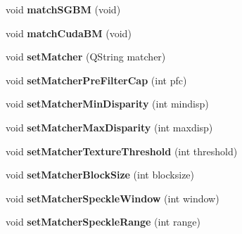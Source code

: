 \begin{DoxyCompactItemize}
\item 
\hypertarget{class_q_stereo_camera_ae4741706dc72c5be061c6ca218e1ad05}{}void {\bfseries match\+S\+G\+B\+M} (void)\label{class_q_stereo_camera_ae4741706dc72c5be061c6ca218e1ad05}

\item 
\hypertarget{class_q_stereo_camera_add46dbf7859730fa50a4cc83dc886974}{}void {\bfseries match\+Cuda\+B\+M} (void)\label{class_q_stereo_camera_add46dbf7859730fa50a4cc83dc886974}

\item 
\hypertarget{class_q_stereo_camera_a248782fdebc3cdf41420b3d84659977b}{}void {\bfseries set\+Matcher} (Q\+String matcher)\label{class_q_stereo_camera_a248782fdebc3cdf41420b3d84659977b}

\item 
\hypertarget{class_q_stereo_camera_aabf3ecce7eb18bb01bb112d777f10776}{}void {\bfseries set\+Matcher\+Pre\+Filter\+Cap} (int pfc)\label{class_q_stereo_camera_aabf3ecce7eb18bb01bb112d777f10776}

\item 
\hypertarget{class_q_stereo_camera_a803f534dac5c97cc917d2b4496dfdf17}{}void {\bfseries set\+Matcher\+Min\+Disparity} (int mindisp)\label{class_q_stereo_camera_a803f534dac5c97cc917d2b4496dfdf17}

\item 
\hypertarget{class_q_stereo_camera_aa64c0dde412216add90face6405f2271}{}void {\bfseries set\+Matcher\+Max\+Disparity} (int maxdisp)\label{class_q_stereo_camera_aa64c0dde412216add90face6405f2271}

\item 
\hypertarget{class_q_stereo_camera_aee2bf5eea7c676d667259d42a78df576}{}void {\bfseries set\+Matcher\+Texture\+Threshold} (int threshold)\label{class_q_stereo_camera_aee2bf5eea7c676d667259d42a78df576}

\item 
\hypertarget{class_q_stereo_camera_a722a9df6ecd425106dd8b8e893bbad06}{}void {\bfseries set\+Matcher\+Block\+Size} (int blocksize)\label{class_q_stereo_camera_a722a9df6ecd425106dd8b8e893bbad06}

\item 
\hypertarget{class_q_stereo_camera_a4cbadff365cabfff41667b1d915a6a54}{}void {\bfseries set\+Matcher\+Speckle\+Window} (int window)\label{class_q_stereo_camera_a4cbadff365cabfff41667b1d915a6a54}

\item 
\hypertarget{class_q_stereo_camera_a0343c15d9652e1729b377a76b195bee0}{}void {\bfseries set\+Matcher\+Speckle\+Range} (int range)\label{class_q_stereo_camera_a0343c15d9652e1729b377a76b195bee0}


\end{DoxyCompactItemize}
